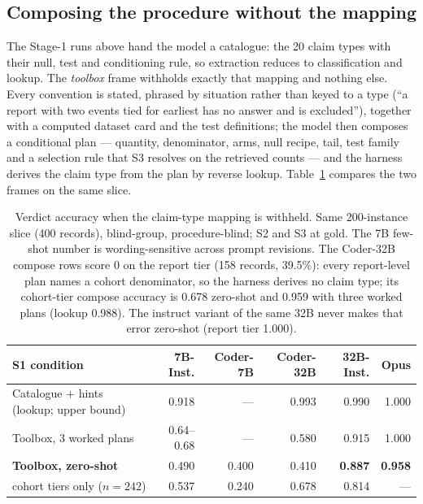 \subsection{Composing the procedure without the mapping}

The Stage-1 runs above hand the model a catalogue: the 20 claim types with
their null, test and conditioning rule, so extraction reduces to classification
and lookup. The \emph{toolbox} frame withholds exactly that mapping and nothing
else. Every convention is stated, phrased by situation rather than keyed to a
type (``a report with two events tied for earliest has no answer and is
excluded''), together with a computed dataset card and the test definitions;
the model then composes a conditional plan --- quantity, denominator, arms,
null recipe, tail, test family and a selection rule that S3 resolves on the
retrieved counts --- and the harness derives the claim type from the plan by
reverse lookup. Table~\ref{tab:toolbox} compares the two frames on the same
slice.

\begin{table}[t]
\centering
\small
\begin{tabular}{lrrrrr}
\toprule
S1 condition & 7B-Inst. & Coder-7B & Coder-32B & \textbf{32B-Inst.} & Opus \\
\midrule
Catalogue + hints (lookup; upper bound) & 0.918 & --- & 0.993 & 0.990 & 1.000 \\
Toolbox, 3 worked plans & 0.64--0.68 & --- & 0.580 & 0.915 & 1.000 \\
\textbf{Toolbox, zero-shot} & 0.490 & 0.400 & 0.410 & \textbf{0.887} & \textbf{0.958} \\
\quad cohort tiers only ($n=242$) & 0.537 & 0.240 & 0.678 & 0.814 & --- \\
\bottomrule
\end{tabular}
\caption{Verdict accuracy when the claim-type mapping is withheld. Same
200-instance slice (400 records), blind-group, procedure-blind; S2 and S3 at
gold. The 7B few-shot number is wording-sensitive across prompt revisions. The
Coder-32B compose rows score 0 on the report tier (158 records, 39.5\%):
every report-level plan names a cohort denominator, so the harness derives no
claim type; its cohort-tier compose accuracy is 0.678 zero-shot and 0.959 with
three worked plans (lookup 0.988). The instruct variant of the same 32B never
makes that error zero-shot (report tier 1.000).}
\label{tab:toolbox}
\end{table}

